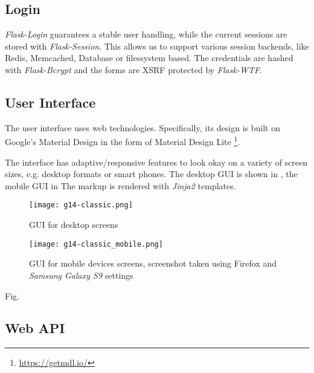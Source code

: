 \subsection{Login}
\label{g14:sec:implementation:login}
\textit{Flask-Login} guarantees a stable user handling, while the current sessions are stored with \textit{Flask-Session}. This allows us to support various session backends, like Redis, Memcached, Database or filessystem based. The credentials are hashed with \textit{Flask-Bcrypt} and the forms are XSRF protected by \textit{Flask-WTF}. 

\subsection{User Interface}
\label{g14:sec:implementation:UI}

The user interface uses web technologies. Specifically, its design is built on Google's Material Design in the form of Material Design Lite \footnote{\url{https://getmdl.io/}}.

The interface has adaptive/responsive features to look okay on a variety of screen sizes, e.g. desktop formats or smart phones. The desktop GUI is shown in , the mobile GUI in 
The markup is rendered with \textit{Jinja2} templates.




\begin{figure}[tb]
\centering
\texttt{[image: g14-classic.png]}
\caption{GUI for desktop screens}
\label{fig:guiclassicdesktop}
\end{figure}


\begin{figure}[tb]
\centering
\texttt{[image: g14-classic\_mobile.png]}
\caption{GUI for mobile devices screens, screenshot taken using Firefox and \textit{Samsung Galaxy S9} settings}
\label{fig:guiclassicmobile}
\end{figure}

Fig. 


\subsection{Web API}
\label{g14:sec:implementation:API}




